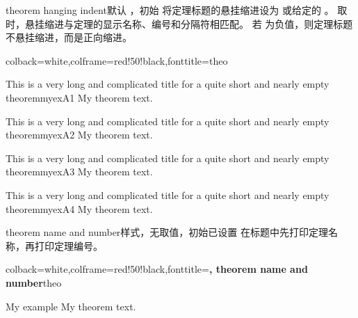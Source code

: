 \clearpage

\begin{docTcbKey}[][doc new=2020-10-21]{theorem hanging indent}{}{默认 ，初始 }
  将定理标题的悬挂缩进设为  或给定的 。
  取  时，悬挂缩进与定理的显示名称、编号和分隔符相匹配。
  若  为负值，则定理标题不悬挂缩进，而是正向缩进。

\begin{dispExample}
%
  {colback=white,colframe=red!50!black,fonttitle=\bfseries}{theo}

\begin{sometheorem}{This is a very long and complicated title for a quite
  short and nearly empty theorem}{myexA1}
My theorem text.
\end{sometheorem}

\begin{sometheorem}[theorem hanging indent=5mm]{This is a very long and
  complicated title for a quite short and nearly empty theorem}{myexA2}
My theorem text.
\end{sometheorem}

\begin{sometheorem}[theorem hanging indent=0pt]{This is a very long and
  complicated title for a quite short and nearly empty theorem}{myexA3}
My theorem text.
\end{sometheorem}

\begin{sometheorem}[theorem hanging indent=-5mm]{This is a very long and
  complicated title for a quite short and nearly empty theorem}{myexA4}
My theorem text.
\end{sometheorem}
\end{dispExample}
\end{docTcbKey}



\clearpage
\begin{docTcbKey}{theorem name and number}{}{样式，无取值，初始已设置}
在标题中先打印定理名称，再打印定理编号。
\begin{dispExample}
%
  {colback=white,colframe=red!50!black,fonttitle=\bfseries,
   theorem name and number}{theo}
\begin{sometheorem}{My example}{}
My theorem text.
\end{sometheorem}
\end{dispExample}
\end{docTcbKey}


